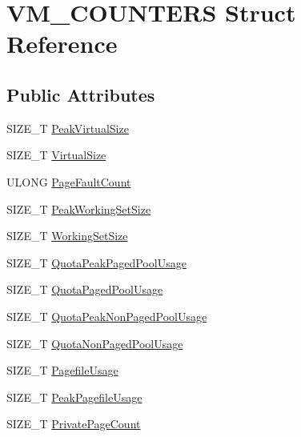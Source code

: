 \hypertarget{structVM__COUNTERS}{\section{V\-M\-\_\-\-C\-O\-U\-N\-T\-E\-R\-S Struct Reference}
\label{structVM__COUNTERS}
}
\subsection*{Public Attributes}
\begin{DoxyCompactItemize}
\item 
S\-I\-Z\-E\-\_\-\-T \hyperlink{structVM__COUNTERS_ab4c550548ddf9b6357ea0f57ce1cf946}{Peak\-Virtual\-Size}
\item 
S\-I\-Z\-E\-\_\-\-T \hyperlink{structVM__COUNTERS_ab394da4c4d9b606a2ad4c00892a6917f}{Virtual\-Size}
\item 
U\-L\-O\-N\-G \hyperlink{structVM__COUNTERS_a2cc46c0341e51f5fd53025bdf0e5658c}{Page\-Fault\-Count}
\item 
S\-I\-Z\-E\-\_\-\-T \hyperlink{structVM__COUNTERS_a15bea203127750ef7fe4fbcd682a7126}{Peak\-Working\-Set\-Size}
\item 
S\-I\-Z\-E\-\_\-\-T \hyperlink{structVM__COUNTERS_a8fff1cd61413ea383c0a9471ff59d033}{Working\-Set\-Size}
\item 
S\-I\-Z\-E\-\_\-\-T \hyperlink{structVM__COUNTERS_a2bfa57675a50a5d3207f0f2b178ac16b}{Quota\-Peak\-Paged\-Pool\-Usage}
\item 
S\-I\-Z\-E\-\_\-\-T \hyperlink{structVM__COUNTERS_ace274383d4b485e37b95809456e16ee3}{Quota\-Paged\-Pool\-Usage}
\item 
S\-I\-Z\-E\-\_\-\-T \hyperlink{structVM__COUNTERS_a9eb845d5989f40f4e277c622fe7bdbb5}{Quota\-Peak\-Non\-Paged\-Pool\-Usage}
\item 
S\-I\-Z\-E\-\_\-\-T \hyperlink{structVM__COUNTERS_a27d5ebeb3ecbcb71a00eb44742417a80}{Quota\-Non\-Paged\-Pool\-Usage}
\item 
S\-I\-Z\-E\-\_\-\-T \hyperlink{structVM__COUNTERS_a1ae3e46e1816321cadd686716c301e8a}{Pagefile\-Usage}
\item 
S\-I\-Z\-E\-\_\-\-T \hyperlink{structVM__COUNTERS_ab30aac195648217a62055b4267aad106}{Peak\-Pagefile\-Usage}
\item 
S\-I\-Z\-E\-\_\-\-T \hyperlink{structVM__COUNTERS_aacbc9ccd46f05cb18cc67ee292ed1a82}{Private\-Page\-Count}
\end{DoxyCompactItemize}


